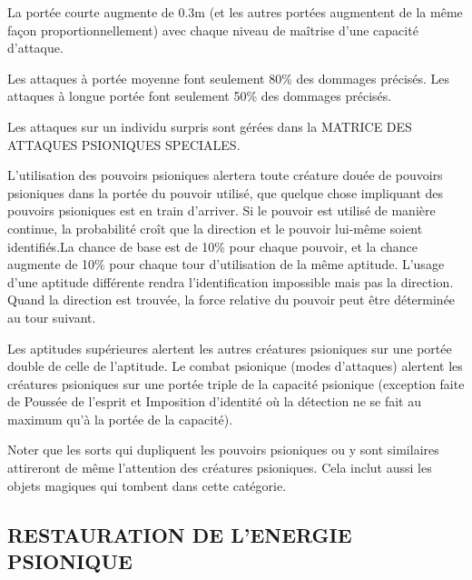 \documentclass[11pt]{article}
\begin{document}
{\bigskip

La portée courte augmente de 0.3m (et les autres portées augmentent de la même façon proportionnellement) avec chaque niveau de maîtrise d'une capacité d'attaque.

\bigskip

Les attaques à portée moyenne font seulement 80\% des dommages précisés. Les attaques à longue portée font seulement 50\% des dommages précisés.

\bigskip

Les attaques sur un individu surpris sont gérées dans la MATRICE DES ATTAQUES PSIONIQUES SPECIALES.

\bigskip

L'utilisation des pouvoirs psioniques alertera toute créature douée de pouvoirs psioniques dans la portée du pouvoir utilisé, que quelque chose impliquant des pouvoirs psioniques est en train d'arriver. Si le pouvoir est utilisé de manière continue, la probabilité croît que la direction et le pouvoir lui-même soient identifiés.La chance de base est de 10\% pour chaque pouvoir, et la chance augmente de 10\% pour chaque tour d'utilisation de la même aptitude. L'usage d'une aptitude différente rendra l'identification impossible mais pas la direction. Quand la direction est trouvée, la force relative du pouvoir peut être déterminée au tour suivant.

\bigskip

Les aptitudes supérieures alertent les autres créatures psioniques sur une portée double de celle de l'aptitude. Le combat psionique (modes d'attaques) alertent les créatures psioniques sur une portée triple de la capacité psionique (exception faite de Poussée de l'esprit et Imposition d'identité où la détection ne se fait au maximum qu'à la portée de la capacité).

\bigskip

Noter que les sorts qui dupliquent les pouvoirs psioniques ou y sont similaires attireront de même l'attention des créatures psioniques. Cela inclut aussi les objets magiques qui tombent dans cette catégorie.

\subsection*{\normalsize RESTAURATION DE L'ENERGIE PSIONIQUE}

}
\end{document}

